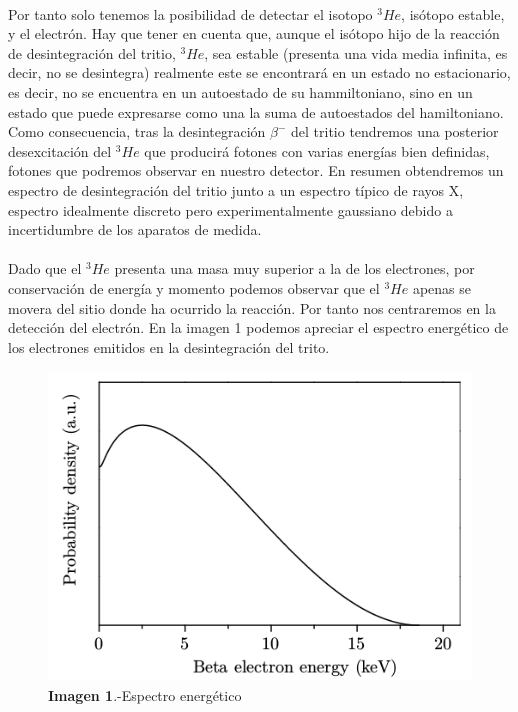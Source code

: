 \paragraph {}
Por tanto solo tenemos la posibilidad de detectar el isotopo $^3He$, isótopo estable, y el electrón. Hay que tener en cuenta que, aunque el isótopo hijo de la reacción de desintegración del tritio, $^3He$, sea estable (presenta una vida media infinita, es decir, no se desintegra) realmente este se encontrará en un estado no estacionario, es decir, no se encuentra en un autoestado de su hammiltoniano, sino en un estado que puede expresarse como una la suma de autoestados del hamiltoniano. Como consecuencia, tras la desintegración $\beta^-$ del tritio tendremos una posterior desexcitación del $^3He$ que producirá fotones con varias energías bien definidas, fotones que podremos observar en nuestro detector. En resumen obtendremos un espectro de desintegración del tritio junto a un espectro típico de rayos X, espectro idealmente discreto pero experimentalmente gaussiano debido a incertidumbre de los aparatos de medida.

\paragraph {}
Dado que el $^3He$ presenta una masa muy superior a la de los electrones, por conservación de energía y momento podemos observar que el $^3He$ apenas se movera del sitio donde ha ocurrido la reacción. Por tanto nos centraremos en la detección del electrón. En la imagen 1 podemos apreciar el espectro energético de los electrones emitidos en la desintegración del trito.

\begin{figure}[hbtp]
\includegraphics[scale=0.4]{Espectro.png}
\centering
\caption{\textbf{Imagen 1}.-Espectro energético}
\end{figure}


